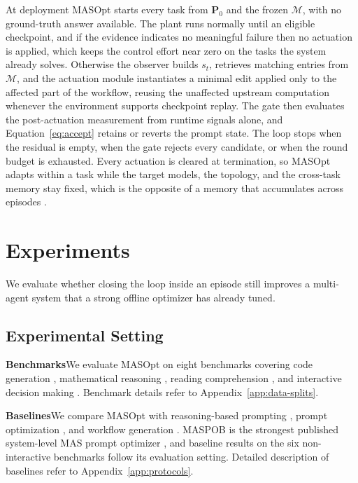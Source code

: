 \documentclass{article}
\theoremstyle{definition}
\begin{document}
At deployment MASOpt starts every task from $\mathbf{P}_0$ and the frozen $\mathcal{M}$, with no ground-truth answer available. The plant runs normally until an eligible checkpoint, and if the evidence indicates no meaningful failure then no actuation is applied, which keeps the control effort near zero on the tasks the system already solves. Otherwise the observer builds $s_t$, retrieves matching entries from $\mathcal{M}$, and the actuation module instantiates a minimal edit applied only to the affected part of the workflow, reusing the unaffected upstream computation whenever the environment supports checkpoint replay. The gate then evaluates the post-actuation measurement from runtime signals alone, and Equation~\ref{eq:accept} retains or reverts the prompt state. The loop stops when the residual is empty, when the gate rejects every candidate, or when the round budget is exhausted. Every actuation is cleared at termination, so MASOpt adapts within a task while the target models, the topology, and the cross-task memory stay fixed, which is the opposite of a memory that accumulates across episodes \citep{shinn2023reflexion,zhang2026memrl}.

\section{Experiments}
\label{sec:experiments}

We evaluate whether closing the loop inside an episode still improves a multi-agent system that a strong offline optimizer has already tuned.

\subsection{Experimental Setting}
\label{sec:experimental-setup}

\textbf{Benchmarks}\quad We evaluate MASOpt on eight benchmarks covering code generation \citep{chen2021humaneval,austin2021mbpp}, mathematical reasoning \citep{cobbe2021gsm8k,hendrycks2021math}, reading comprehension \citep{yang2018hotpotqa,dua2019drop}, and interactive decision making \citep{shridhar2020alfworld,prasad2024textcraft}. Benchmark details refer to Appendix~\ref{app:data-splits}.

\textbf{Baselines}\quad We compare MASOpt with reasoning-based prompting \citep{wei2022cot,yao2023react}, prompt optimization \citep{fernando2024promptbreeder,lin2023instinct,opsahlong2024mipro,hong2026maspob}, and workflow generation \citep{zhang2024aflow,xia2025hivemind}. MASPOB is the strongest published system-level MAS prompt optimizer \citep{hong2026maspob}, and baseline results on the six non-interactive benchmarks follow its evaluation setting. Detailed description of baselines refer to Appendix~\ref{app:protocols}.
\end{document}

